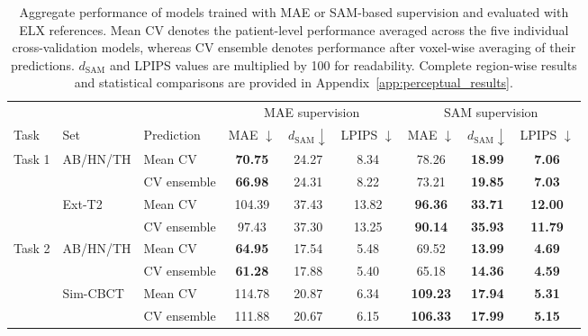 \documentclass[lettersize,journal]{IEEEtran}
\begin{document}
\begin{table}[h!]
\centering
\scriptsize
\setlength{\tabcolsep}{4pt}
\renewcommand{\arraystretch}{1.15}
\caption{Aggregate performance of models trained with MAE or SAM-based supervision and evaluated with ELX references. Mean CV denotes the patient-level performance averaged across the five individual cross-validation models, whereas CV ensemble denotes performance after voxel-wise averaging of their predictions. $d_{\mathrm{SAM}}$ and LPIPS values are multiplied by 100 for readability. Complete region-wise results and statistical comparisons are provided in Appendix~\ref{app:perceptual_results}.}
\label{tab:sam_perceptual_compact}
\begin{tabular}{lllcccccc}
\toprule
& & & \multicolumn{3}{c}{MAE supervision}
& \multicolumn{3}{c}{SAM supervision} \\
\cmidrule(lr){4-6} \cmidrule(lr){7-9}
Task & Set & Prediction
& MAE $\downarrow$ & $d_{\mathrm{SAM}}\downarrow$ & LPIPS $\downarrow$
& MAE $\downarrow$ & $d_{\mathrm{SAM}}\downarrow$ & LPIPS $\downarrow$ \\
\midrule
\multirow{4}{*}{Task 1}
& \multirow{2}{*}{AB/HN/TH}
& Mean CV
& \textbf{70.75} & 24.27 & 8.34
& 78.26 & \textbf{18.99} & \textbf{7.06} \\
&
& CV ensemble
& \textbf{66.98} & 24.31 & 8.22
& 73.21 & \textbf{19.85} & \textbf{7.03} \\
\cmidrule(lr){2-9}
& \multirow{2}{*}{Ext-T2}
& Mean CV
& 104.39 & 37.43 & 13.82
& \textbf{96.36} & \textbf{33.71} & \textbf{12.00} \\
&
& CV ensemble
& 97.43 & 37.30 & 13.25
& \textbf{90.14} & \textbf{35.93} & \textbf{11.79} \\
\midrule
\multirow{4}{*}{Task 2}
& \multirow{2}{*}{AB/HN/TH}
& Mean CV
& \textbf{64.95} & 17.54 & 5.48
& 69.52 & \textbf{13.99} & \textbf{4.69} \\
&
& CV ensemble
& \textbf{61.28} & 17.88 & 5.40
& 65.18 & \textbf{14.36} & \textbf{4.59} \\
\cmidrule(lr){2-9}
& \multirow{2}{*}{Sim-CBCT}
& Mean CV
& 114.78 & 20.87 & 6.34
& \textbf{109.23} & \textbf{17.94} & \textbf{5.31} \\
&
& CV ensemble
& 111.88 & 20.67 & 6.15
& \textbf{106.33} & \textbf{17.99} & \textbf{5.15} \\
\bottomrule
\end{tabular}

\end{table}
\renewcommand{\arraystretch}{1}
\end{document}
